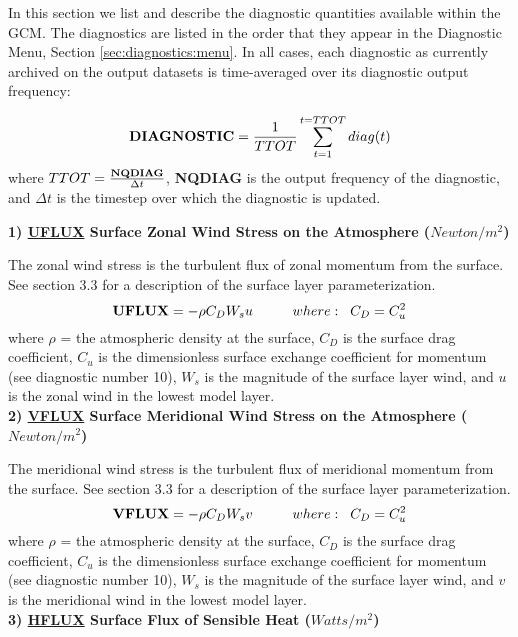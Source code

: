 In this section we list and describe the diagnostic quantities available within the 
GCM.  The diagnostics are listed in the order that they appear in the 
Diagnostic Menu, Section \ref{sec:diagnostics:menu}.
In all cases, each diagnostic as currently archived on the output datasets
is time-averaged over its diagnostic output frequency:

\[
{\bf DIAGNOSTIC} = {1 \over TTOT} \sum_{t=1}^{t=TTOT} diag(t)
\]
where $TTOT = {{\bf NQDIAG} \over \Delta t}$, {\bf NQDIAG} is the 
output frequency of the diagnostic, and $\Delta t$ is
the timestep over which the diagnostic is updated.  

{\bf 1)  \underline {UFLUX} Surface Zonal Wind Stress on the Atmosphere ($Newton/m^2$) } 

The zonal wind stress is the turbulent flux of zonal momentum from 
the surface. See section 3.3 for a description of the surface layer parameterization.
\[
{\bf UFLUX} =  - \rho C_D W_s u \hspace{1cm}where: \hspace{.2cm}C_D = C^2_u
\]
where $\rho$ = the atmospheric density at the surface, $C_{D}$ is the surface
drag coefficient, $C_u$ is the dimensionless surface exchange coefficient for momentum 
(see diagnostic number 10), $W_s$ is the magnitude of the surface layer wind, and $u$ is 
the zonal wind in the lowest model layer.
\\


{\bf 2)  \underline {VFLUX} Surface Meridional Wind Stress on the Atmosphere ($Newton/m^2$) } 

The meridional wind stress is the turbulent flux of meridional momentum from 
the surface. See section 3.3 for a description of the surface layer parameterization.
\[
{\bf VFLUX} =  - \rho C_D W_s v \hspace{1cm}where: \hspace{.2cm}C_D = C^2_u
\]
where $\rho$ = the atmospheric density at the surface, $C_{D}$ is the surface
drag coefficient, $C_u$ is the dimensionless surface exchange coefficient for momentum 
(see diagnostic number 10), $W_s$ is the magnitude of the surface layer wind, and $v$ is 
the meridional wind in the lowest model layer.
\\

{\bf 3)  \underline {HFLUX} Surface Flux of Sensible Heat ($Watts/m^2$) } 

